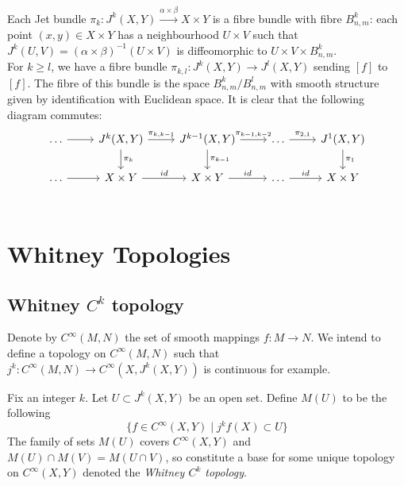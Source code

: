 \documentclass[12pt]{article}
\begin{document}
Each Jet bundle $\pi_k: J^k(X, Y) \xrightarrow{\alpha \times \beta} X\times Y$ is a fibre bundle with fibre $B_{n, m}^k$: each point $(x, y) \in X\times Y$ has a neighbourhood $U\times V$ such that $J^k(U, V) = (\alpha \times \beta)^{-1}(U\times V)$ is diffeomorphic to $U \times V \times B_{n, m}^k$. \\

For $k \geq l$, we have a fibre bundle $\pi_{k, l}: J^k(X, Y) \to J^l(X, Y)$ sending $[f]$ to $[f]$. The fibre of this bundle is the space $B^k_{n, m} / B^l_{n, m}$ with smooth structure given by identification with Euclidean space. It is clear that the following diagram commutes:
$$
\begin{tikzcd}
    \dots \arrow[r] & J^k(X, Y) \arrow[r, "\pi_{k, k-1}"] \arrow[d, "\pi_k"] & J^{k-1} (X, Y) \arrow[d, "\pi_{k-1}"] \arrow[r, "\pi_{k-1, k-2}"] & \dots\arrow[r, "\pi_{2, 1}"] & J^1(X, Y) \arrow[d, "\pi_1"] \\
    \arrow[r] \dots & X\times Y \arrow[r, "id"] & X\times Y \arrow[r, "id"]& \dots \arrow[r, "id"]& X\times Y \\
\end{tikzcd}
$$

\section{Whitney Topologies}
\subsection{Whitney $C^k$ topology}
Denote by $C^\infty(M, N)$ the set of smooth mappings $f: M\to N$. We intend to define a topology on $C^\infty(M, N)$ such that $j^k: C^\infty(M, N) \to C^\infty(X, J^k(X, Y))$ is continuous for example. 

\begin{definition}
    Fix an integer $k$. Let $U\subset J^k(X, Y)$ be an open set. Define $M(U)$ to be the following
    $$
    \{ f\in C^\infty(X, Y) \mid j^k f (X) \subset U\}
    $$
    The family of sets $M(U)$ covers $C^\infty(X, Y)$ and $M(U) \cap M(V) = M(U\cap V)$, so constitute a base for some unique topology on $C^\infty(X, Y)$ denoted the \emph{Whitney $C^k$ topology}. \\
\end{definition}
\end{document}
